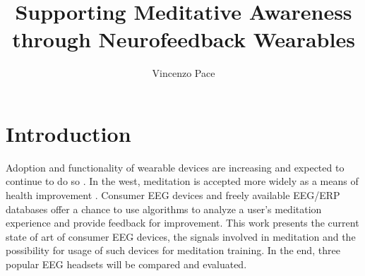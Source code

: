 \documentclass{llncs} %
\begin{document}
\title{Supporting Meditative Awareness through Neurofeedback Wearables}
\author{Vincenzo Pace}
\maketitle
\newpage
\section{Introduction}
Adoption and functionality of wearable devices are increasing and expected to continue to do so \cite{Patel}. In the west, meditation is accepted more widely as a means of health improvement \cite{Tang:et al}.
Consumer EEG devices and freely available EEG/ERP databases \cite{ucsd} offer a chance to use algorithms to analyze a user's meditation experience and provide feedback for improvement.
This work presents the current state of art of consumer EEG devices, the signals involved in meditation and the possibility for usage of such devices for meditation training.
In the end, three popular EEG headsets will be compared and evaluated.
\end{document}
